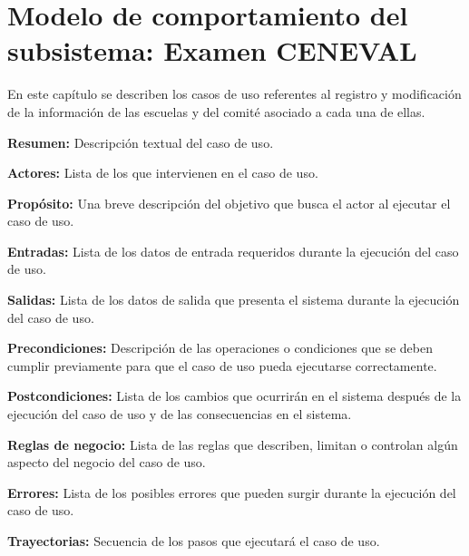 

\chapter{Modelo de comportamiento del subsistema: Examen CENEVAL \label{chp:REscuelas}}
En este capítulo se describen los casos de uso referentes al registro y modificación de la información de las escuelas y del comité asociado a cada una de ellas. \bigskip

     \begin{objetivos}
	\item {\bf Resumen:} Descripción textual del caso de uso.
	\item {\bf Actores:} Lista de los 
	 que intervienen en el caso de uso.
	\item {\bf Propósito:} Una breve descripción del objetivo que busca el actor al ejecutar el caso de uso.
	\item {\bf Entradas:} Lista de los datos de entrada requeridos durante la ejecución del caso de uso.
	\item {\bf Salidas:} Lista de los datos de salida que presenta el sistema durante la ejecución del caso de uso.
	\item {\bf Precondiciones:} Descripción de las operaciones o condiciones que se deben cumplir previamente para que el caso de uso pueda ejecutarse correctamente.
	\item {\bf Postcondiciones:} Lista de los cambios que ocurrirán en el sistema después de la ejecución del caso de uso y de las consecuencias en el sistema.
	\item {\bf Reglas de negocio:} Lista de las reglas que describen, limitan o controlan algún aspecto del negocio del caso de uso.
	\item {\bf Errores:} Lista de los posibles errores que pueden surgir durante la ejecución del caso de uso.
	\item {\bf Trayectorias:} Secuencia de los pasos que ejecutará el caso de uso.
    \end{objetivos}




	
